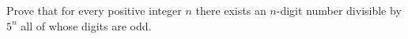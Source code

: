 Prove that for every positive integer $n$ there exists an $n$-digit number divisible by $5^n$ all of whose digits are odd.
